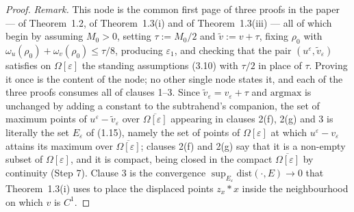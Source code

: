 \begin{proof}
\medskip\noindent\emph{Remark.} This node is the common first page of three proofs in the
paper --- of Theorem~1.2, of Theorem~1.3(i) and of Theorem~1.3(iii) --- all of which begin by
assuming $M_0>0$, setting $\tau:=M_0/2$ and $\tilde v:=v+\tau$, fixing $\rho_0$ with
$\omega_u(\rho_0)+\omega_v(\rho_0)\le\tau/8$, producing $\varepsilon_1$, and checking that
the pair $(u^{\varepsilon},\tilde v_{\varepsilon})$ satisfies on $\Omega[\varepsilon]$ the
standing assumptions (3.10) with $\tau/2$ in place of $\tau$. Proving it once is the
content of the node; no other single node states it, and each of the three proofs consumes
all of clauses 1--3. Since $\tilde v_{\varepsilon}=v_{\varepsilon}+\tau$ and
$\mathrm{argmax}$ is unchanged by adding a constant to the subtrahend's companion, the set
of maximum points of $u^{\varepsilon}-\tilde v_{\varepsilon}$ over
$\overline{\Omega[\varepsilon]}$ appearing in clauses 2(f), 2(g) and 3 is literally the set
$E_\varepsilon$ of (1.15), namely the set of points of $\Omega[\varepsilon]$ at which
$u^{\varepsilon}-v_{\varepsilon}$ attains its maximum over
$\overline{\Omega[\varepsilon]}$; clauses 2(f) and 2(g) say that it is a non-empty subset of
$\Omega[\varepsilon]$, and it is compact, being closed in the compact
$\overline{\Omega[\varepsilon]}$ by continuity (Step 7). Clause 3 is the convergence
$\sup_{E_\varepsilon}\mathrm{dist}(\cdot,E)\to0$ that Theorem~1.3(i) uses to place the
displaced points $z_x*x$ inside the neighbourhood on which $v$ is $C^1$.
\end{proof}
